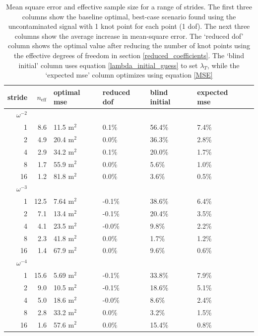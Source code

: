 \documentclass[10pt,journal]{IEEEtran}
\begin{document}
\begin{table}[ht]
\caption{Mean square error and effective sample size for a range of strides. The first three columns show the baseline optimal, best-case scenario found using the uncontaminated signal with 1 knot point for each point (1 dof). The next three columns show the average increase in mean-square error. The `reduced dof' column shows the optimal value after reducing the number of knot points using the effective degrees of freedom in section \ref{reduced_coefficients}. The `blind initial' column uses equation \ref{lambda_initial_guess} to set $\lambda_T$, while the `expected mse' column optimizes using equation \ref{MSE} }
\label{fit_results_gaussian}
\centering
\begin{tabular}{r r p{1cm} | p{1cm}p{1cm}p{1cm}p{1cm}} stride & $n_\textrm{eff}$ & optimal mse & reduced dof & blind initial & expected mse \\ \hline \hline 
$\omega^{-2}$ &&&&&  \\ \hline 
1 & 8.6 & 11.5 m$^2$ &  0.1\%  &  56.4\%  &  7.4\%  \\ 
2 & 4.9 & 20.4 m$^2$ &  0.0\%  &  36.3\%  &  2.8\%  \\ 
4 & 2.9 & 34.2 m$^2$ &  0.1\%  &  20.0\%  &  1.7\%  \\ 
8 & 1.7 & 55.9 m$^2$ &  0.0\%  &  5.6\%  &  1.0\%  \\ 
16 & 1.2 & 81.8 m$^2$ &  0.0\%  &  3.6\%  &  0.5\%  \\ 
$\omega^{-3}$ &&&&&  \\ \hline 
1 & 12.5 & 7.64 m$^2$ &  -0.1\%  &  38.6\%  &  6.4\%  \\ 
2 & 7.1 & 13.4 m$^2$ &  -0.1\%  &  20.4\%  &  3.5\%  \\ 
4 & 4.1 & 23.5 m$^2$ &  -0.0\%  &  9.8\%  &  2.2\%  \\ 
8 & 2.3 & 41.8 m$^2$ &  0.0\%  &  1.7\%  &  1.2\%  \\ 
16 & 1.4 & 67.9 m$^2$ &  0.0\%  &  9.6\%  &  0.6\%  \\ 
$\omega^{-4}$ &&&&&  \\ \hline 
1 & 15.6 & 5.69 m$^2$ &  -0.1\%  &  33.8\%  &  7.9\%  \\ 
2 & 9.0 & 10.5 m$^2$ &  -0.1\%  &  18.6\%  &  5.1\%  \\ 
4 & 5.0 & 18.6 m$^2$ &  -0.0\%  &  8.6\%  &  2.4\%  \\ 
8 & 2.8 & 33.2 m$^2$ &  0.0\%  &  3.2\%  &  1.5\%  \\ 
16 & 1.6 & 57.6 m$^2$ &  0.0\%  &  15.4\%  &  0.8\%  \\ 
\end{tabular} 

\end{table}
\end{document}
